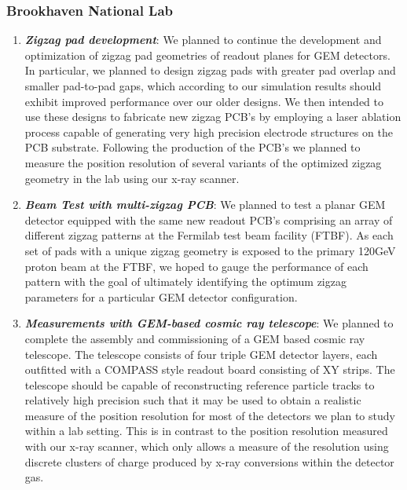 \subsubsection{Brookhaven National Lab} 

\begin{enumerate}

\item	\textbf{\emph{Zigzag pad development}}: We planned to continue the development and optimization of zigzag pad geometries of readout planes for GEM detectors. In particular, we planned to design zigzag pads with greater pad overlap and smaller pad-to-pad gaps, which according to our simulation results should exhibit improved performance over our older designs. We then intended to use these designs to fabricate new zigzag PCB’s by employing a laser ablation process capable of generating very high precision electrode structures on the PCB substrate. Following the production of the PCB’s we planned to measure the position resolution of several variants of the optimized zigzag geometry in the lab using our x-ray scanner. 

\item \textbf{\emph{Beam Test with multi-zigzag PCB}}: We planned to test a planar GEM detector equipped with the same new readout PCB’s comprising an array of different zigzag patterns at the Fermilab test beam facility (FTBF). As each set of pads with a unique zigzag geometry is exposed to the primary 120GeV proton beam at the FTBF, we hoped to gauge the performance of each pattern with the goal of ultimately identifying the optimum zigzag parameters for a particular GEM detector configuration.  

\item	\textbf{\emph{Measurements with GEM-based cosmic ray telescope}}: We planned to complete the assembly and commissioning of a GEM based cosmic ray telescope. The telescope consists of four triple GEM detector layers, each outfitted with a COMPASS style readout board consisting of XY strips. The telescope should be capable of reconstructing reference particle tracks to relatively high precision such that it may be used to obtain a realistic measure of the position resolution for most of the detectors we plan to study within a lab setting. This is in contrast to the position resolution measured with our x-ray scanner, which only allows a measure of the resolution using discrete clusters of charge produced by x-ray conversions within the detector gas.   


\end{enumerate}
